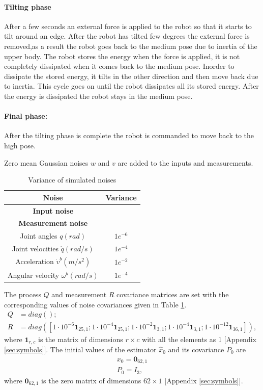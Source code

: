 \paragraph{Tilting phase} After a few seconds an external force is applied to the robot so that it starts to tilt around an edge. After the robot has tilted few degrees the external force is removed,as a result the robot goes back to the medium pose due to inertia of the upper body. The robot stores the energy when the force is applied, it is not completely dissipated when it comes back to the medium pose. Inorder to dissipate the stored energy, it tilts in the other direction and then move back due to inertia. This cycle goes on until the robot dissipates all its stored energy. After the energy is dissipated the robot stays in the medium pose.
\paragraph{Final phase:} After the tilting phase is complete the robot is commanded to move back to the high pose.


Zero mean Gaussian noises $w$ and $v$ are added to the inputs and measurements.
\begin{table}[H]
    \centering
    \begin{tabular}{|c|c|}
    \hline
    Noise &Variance \\ \hline
    \textbf{Input noise} &\hspace{2mm}\\
    \hline
    \textbf{Measurement noise} &\hspace{2mm}\\
    Joint angles $q(rad)$ &$1e^{-6}$ \\ 
    Joint velocities $\dot q(rad/s)$ &$1e^{-4}$ \\
    Acceleration $\dot v^b(m/s^2)$ &$1e^{-2}$ \\ 
    Angular velocity $\omega^b(rad/s)$ &$1e^{-4}$ \\ \hline
    \end{tabular}
    \caption{Variance of simulated noises}
    \label{tab:toro_var}
\end{table}

The process $Q$ and measurement $R$ covariance matrices are set with the corresponding values of noise covariances given in Table \ref{tab:toro_var}. 
$$  \begin{aligned}
         Q &= diag();\\
         R &= diag([1\cdot{10}^{-6} \textbf{1}_{25,1}; 1\cdot{10}^{-4}\textbf{1}_{25,1}; 1\cdot{10}^{-2}\textbf{1}_{3,1};1\cdot{10}^{-4}\textbf{1}_{3,1}; 1\cdot{10}^{-12}\textbf{1}_{36,1} ]),
     \end{aligned}$$
where $\textbf{1}_{r,c}$ is the matrix of dimensions $r \times c$ with all the elements as 1 [Appendix \ref{sec:symbols}]. The initial values of the estimator $\hat x_0$ and its covariance $P_0$ are 
$$ \begin{aligned} x_0 = \textbf{0}_{62,1}\\ P_0 = I_3, \end{aligned} $$  where $\textbf{0}_{62,1}$ is the zero matrix of dimensions $62 \times 1$ [Appendix \ref{sec:symbols}].



